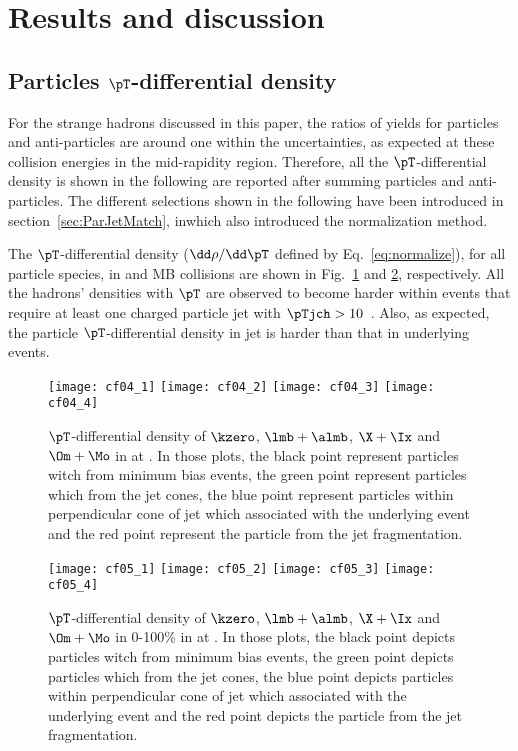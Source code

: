 \documentclass[ALICE,manyauthors]{cernphprep}
\begin{document}
\section{Results and discussion}%
\label{sec:Results}

\subsection{Particles $\pT$-differential density}
\label{subsec:ParPtDensity}

For the strange hadrons discussed in this paper, the ratios of yields for particles and anti-particles are around one within the uncertainties, as expected at these collision energies in the mid-rapidity region.
Therefore, all the $\pT$-differential density is shown in the following are reported after summing particles and anti-particles.
The different selections shown in the following have been introduced in section~\ref{sec:ParJetMatch}, inwhich also introduced the normalization method.

The $\pT$-differential density ($\dd \rho/ \dd \pT$ defined by Eq.~\ref{eq:normalize}), for all particle species, in \pp and MB \pPb collisions are shown in Fig.~\ref{fig:ppSpect} and \ref{fig:pPbSpect}, respectively.
All the hadrons' densities with $\pT$ are observed to become harder within events that require at least one charged particle jet with $\pTjch > 10$~\GeVc.
Also, as expected, the particle $\pT$-differential density in jet is harder than that in underlying events.

\begin{figure}[!ht]
	\begin{center}
		\texttt{[image: cf04\_1]}
		\texttt{[image: cf04\_2]}
		\texttt{[image: cf04\_3]}
		\texttt{[image: cf04\_4]}
	\end{center}
	\caption{$\pT$-differential density of $\kzero$, $\lmb + \almb$, $\X + \Ix$ and $\Om + \Mo$ in \pp at \thirteen. In those plots, the black point represent particles witch from minimum bias events, the green point represent particles which from the jet cones, the blue point represent particles within perpendicular cone of jet which associated with the underlying event and the red point represent the particle from the jet fragmentation.}
	\label{fig:ppSpect}
\end{figure}
\begin{figure}[!ht]
	\begin{center}
		\texttt{[image: cf05\_1]}
		\texttt{[image: cf05\_2]}
		\texttt{[image: cf05\_3]}
		\texttt{[image: cf05\_4]}
	\end{center}
	\caption{$\pT$-differential density of $\kzero$, $\lmb + \almb$, $\X + \Ix$ and $\Om + \Mo$ in 0-100\% in \pPb at \fivenn. In those plots, the black point depicts particles witch from minimum bias events, the green point depicts particles which from the jet cones, the blue point depicts particles within perpendicular cone of jet which associated with the underlying event and the red point depicts the particle from the jet fragmentation.}
	\label{fig:pPbSpect}
\end{figure}
\end{document}
